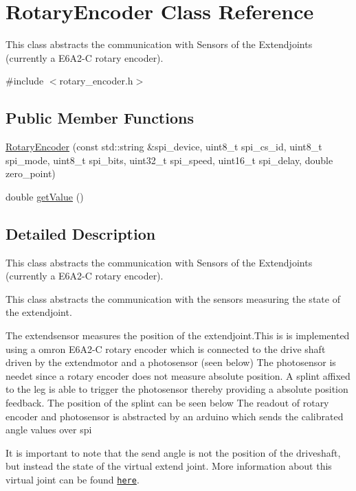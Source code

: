 \hypertarget{classRotaryEncoder}{}\section{Rotary\+Encoder Class Reference}
\label{classRotaryEncoder}


This class abstracts the communication with Sensors of the Extendjoints (currently a E6\+A2-\/C rotary encoder).  




{\ttfamily \#include $<$rotary\+\_\+encoder.\+h$>$}

\subsection*{Public Member Functions}
\begin{DoxyCompactItemize}
\item 
\hyperlink{classRotaryEncoder_a4a133815faa29f99d2a2e53b8568a411}{Rotary\+Encoder} (const std\+::string \&spi\+\_\+device, uint8\+\_\+t spi\+\_\+cs\+\_\+id, uint8\+\_\+t spi\+\_\+mode, uint8\+\_\+t spi\+\_\+bits, uint32\+\_\+t spi\+\_\+speed, uint16\+\_\+t spi\+\_\+delay, double zero\+\_\+point)
\item 
double \hyperlink{classRotaryEncoder_adf89df36f38d0ee87b454f22c25a85f0}{get\+Value} ()
\end{DoxyCompactItemize}


\subsection{Detailed Description}
This class abstracts the communication with Sensors of the Extendjoints (currently a E6\+A2-\/C rotary encoder). 

This class abstracts the communication with the sensors measuring the state of the extendjoint.

The extendsensor measures the position of the extendjoint.\+This is is implemented using a omron E6\+A2-\/C rotary encoder which is connected to the drive shaft driven by the extendmotor and a photosensor (seen below)  The photosensor is needet since a rotary encoder does not measure absolute position. A splint affixed to the leg is able to trigger the photosensor thereby providing a absolute position feedback. The position of the splint can be seen below  The readout of rotary encoder and photosensor is abstracted by an arduino which sends the calibrated angle values over spi

It is important to note that the send angle is not the position of the driveshaft, but instead the state of the virtual extend joint. More information about this virtual joint can be found \href{https://github.com/TriPed-Robot/TriPed-Reference-Document}{\tt here}. 

